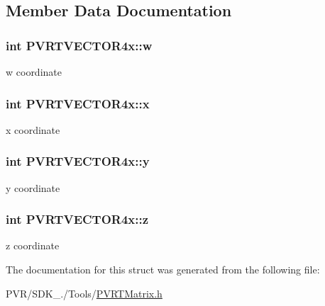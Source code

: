 \subsection{Member Data Documentation}
\hypertarget{struct_p_v_r_t_v_e_c_t_o_r4x_aa21321d20ddb936a51fac7df2579c923}{
\subsubsection[{w}]{\setlength{\rightskip}{0pt plus 5cm}int P\+V\+R\+T\+V\+E\+C\+T\+O\+R4x\+::w}}\label{struct_p_v_r_t_v_e_c_t_o_r4x_aa21321d20ddb936a51fac7df2579c923}
w coordinate \hypertarget{struct_p_v_r_t_v_e_c_t_o_r4x_af155dde870e011662177b1edea2bd61e}{
\subsubsection[{x}]{\setlength{\rightskip}{0pt plus 5cm}int P\+V\+R\+T\+V\+E\+C\+T\+O\+R4x\+::x}}\label{struct_p_v_r_t_v_e_c_t_o_r4x_af155dde870e011662177b1edea2bd61e}
x coordinate \hypertarget{struct_p_v_r_t_v_e_c_t_o_r4x_a31b39ba6fc322352bb27b334130ad14f}{
\subsubsection[{y}]{\setlength{\rightskip}{0pt plus 5cm}int P\+V\+R\+T\+V\+E\+C\+T\+O\+R4x\+::y}}\label{struct_p_v_r_t_v_e_c_t_o_r4x_a31b39ba6fc322352bb27b334130ad14f}
y coordinate \hypertarget{struct_p_v_r_t_v_e_c_t_o_r4x_a21e012e710b2d988831552b8feec1b94}{
\subsubsection[{z}]{\setlength{\rightskip}{0pt plus 5cm}int P\+V\+R\+T\+V\+E\+C\+T\+O\+R4x\+::z}}\label{struct_p_v_r_t_v_e_c_t_o_r4x_a21e012e710b2d988831552b8feec1b94}
z coordinate 

The documentation for this struct was generated from the following file\+:\begin{DoxyCompactItemize}
\item 
P\+V\+R/\+S\+D\+K\+\_./\+Tools/\hyperlink{_p_v_r_t_matrix_8h}{P\+V\+R\+T\+Matrix.\+h}\end{DoxyCompactItemize}
